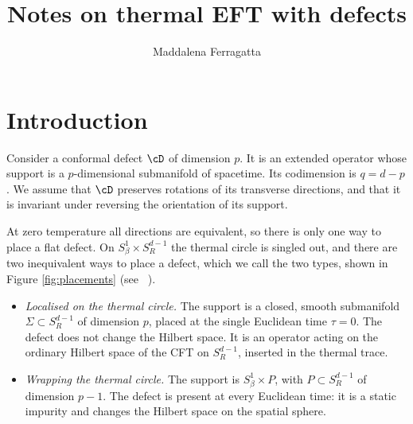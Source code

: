 \documentclass[a4paper,11pt]{article}
\begin{document}
	\title{Notes on thermal EFT with defects}



	\author{Maddalena Ferragatta}



	\maketitle

		
\section{Introduction}\label{sec:bg}

Consider a conformal defect $\cD$ of dimension $p$. It is an extended operator whose support is a $p$-dimensional submanifold of spacetime. Its codimension is $q=d-p$. We assume that $\cD$ preserves rotations of its transverse directions, and that it is invariant under reversing the orientation of its support.

At zero temperature all directions are equivalent, so there is only one way to place a flat defect. On $S^1_\beta\times S^{d-1}_R$ the thermal circle is singled out, and there are two inequivalent ways to place a defect, which we call the two types, shown in Figure \ref{fig:placements} (see ~\cite{Barrat:2024aoa,Artico:2026rye}).
\begin{itemize}
	\item[(a)] \emph{Localised on the thermal circle.} The support is a closed, smooth submanifold $\Sigma\subset S^{d-1}_R$ of dimension $p$, placed at the single Euclidean time $\tau=0$. The defect does not change the Hilbert space. It is an operator acting on the ordinary Hilbert space of the CFT on $S^{d-1}_R$, inserted in the thermal trace.
	\item[(b)] \emph{Wrapping the thermal circle.} The support is $S^1_\beta\times P$, with $P\subset S^{d-1}_R$ of dimension $p-1$. The defect is present at every Euclidean time: it is a static impurity and changes the Hilbert space on the spatial sphere.
	\end{itemize}
\end{document}
